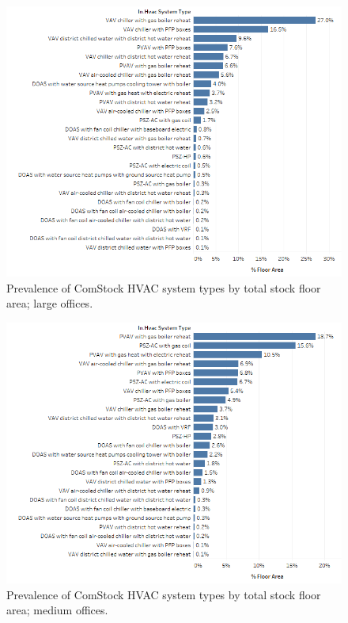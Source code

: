 \begin{figure}
    \centering \includegraphics[width=1.0\textwidth]{figures/HVAC_SYS_Type_PREV_LrgOffice.png}
    \caption[HVAC system type prevalence in large offices]{Prevalence of ComStock HVAC system types by total stock floor area; large offices.}
    \label{fig:hvac_sys_type_prevalence_lrgoffice}
\end{figure}

\begin{figure}
    \centering \includegraphics[width=1.0\textwidth]{figures/HVAC_SYS_Type_PREV_MedOffice.png}
    \caption[HVAC system type prevalence in medium offices]{Prevalence of ComStock HVAC system types by total stock floor area; medium offices.}
    \label{fig:hvac_sys_type_prevalence_medoffice}
\end{figure}

